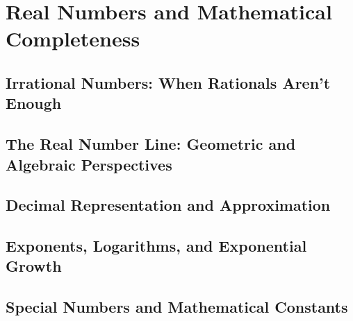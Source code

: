 

\chapter{Real Numbers and Mathematical Completeness}

\section{Irrational Numbers: When Rationals Aren't Enough}

\section{The Real Number Line: Geometric and Algebraic Perspectives}

\section{Decimal Representation and Approximation}

\section{Exponents, Logarithms, and Exponential Growth}

\section{Special Numbers and Mathematical Constants}

